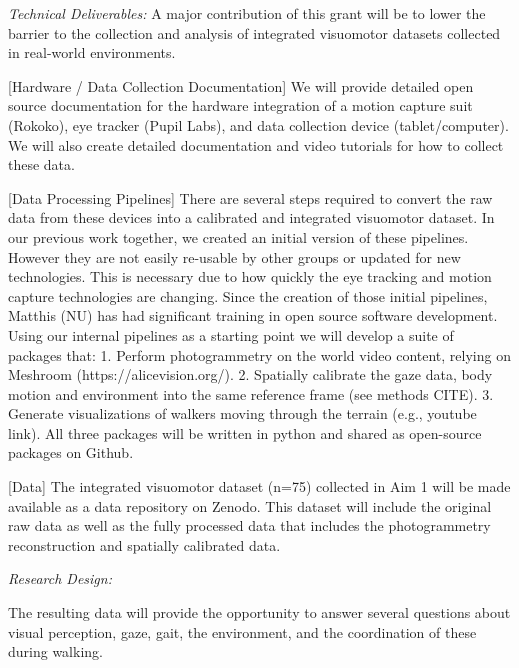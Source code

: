 \documentclass[
]{article}
\begin{document}
\emph{Technical Deliverables:} A major contribution of this grant will
be to lower the barrier to the collection and analysis of integrated
visuomotor datasets collected in real-world environments.

{[}Hardware / Data Collection Documentation{]} We will provide detailed
open source documentation for the hardware integration of a motion
capture suit (Rokoko), eye tracker (Pupil Labs), and data collection
device (tablet/computer). We will also create detailed documentation and
video tutorials for how to collect these data.

{[}Data Processing Pipelines{]} There are several steps required to
convert the raw data from these devices into a calibrated and integrated
visuomotor dataset. In our previous work together, we created an initial
version of these pipelines. However they are not easily re-usable by
other groups or updated for new technologies. This is necessary due to
how quickly the eye tracking and motion capture technologies are
changing. Since the creation of those initial pipelines, Matthis (NU)
has had significant training in open source software development. Using
our internal pipelines as a starting point we will develop a suite of
packages that: 1. Perform photogrammetry on the world video content,
relying on Meshroom (https://alicevision.org/). 2. Spatially calibrate
the gaze data, body motion and environment into the same reference frame
(see methods CITE). 3. Generate visualizations of walkers moving through
the terrain (e.g., youtube link). All three packages will be written in
python and shared as open-source packages on Github.

{[}Data{]} The integrated visuomotor dataset (n=75) collected in Aim 1
will be made available as a data repository on Zenodo. This dataset will
include the original raw data as well as the fully processed data that
includes the photogrammetry reconstruction and spatially calibrated
data.

\emph{Research Design:}

The resulting data will provide the opportunity to answer several
questions about visual perception, gaze, gait, the environment, and the
coordination of these during walking.
\end{document}
